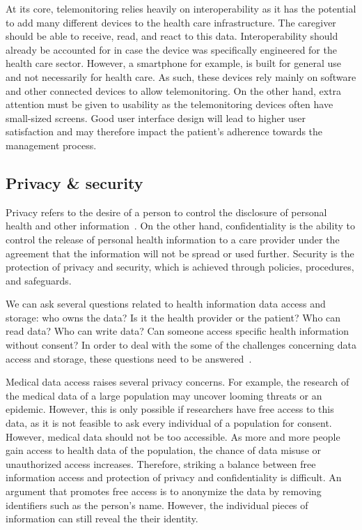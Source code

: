     At its core, telemonitoring relies heavily on interoperability as it has the potential to add many different devices to the health care infrastructure. The caregiver should be able to receive, read, and react to this data. Interoperability should already be accounted for in case the device was specifically engineered for the health care sector. However, a smartphone for example, is built for general use and not necessarily for health care. As such, these devices rely mainly on software and other connected devices to allow telemonitoring. On the other hand, extra attention must be given to usability as the telemonitoring devices often have small-sized screens. Good user interface design will lead to higher user satisfaction and may therefore impact the patient's adherence towards the management process.

    \subsection{Privacy \& security}\label{privacy}

    Privacy refers to the desire of a person to control the disclosure of personal health and other information~\cite{Shortliffe2014}. On the other hand, confidentiality is the ability to control the release of personal health information to a care provider under the agreement that the information will not be spread or used further. Security is the protection of privacy and security, which is achieved through policies, procedures, and safeguards. 

    We can ask several questions related to health information data access and storage: who owns the data? Is it the health provider or the patient? Who can read data? Who can write data? Can someone access specific health information without consent? In order to deal with the some of the challenges concerning data access and storage, these questions need to be answered~\cite{Meingast2006}.

    Medical data access raises several privacy concerns. For example, the research of the medical data of a large population may uncover looming threats or an epidemic. However, this is only possible if researchers have free access to this data, as it is not feasible to ask every individual of a population for consent. However, medical data should not be too accessible. As more and more people gain access to health data of the population, the chance of data misuse or unauthorized access increases. Therefore, striking a balance between free information access and protection of privacy and confidentiality is difficult. An argument that promotes free access is to anonymize the data by removing identifiers such as the person's name. However, the individual pieces of information can still reveal the their identity.

